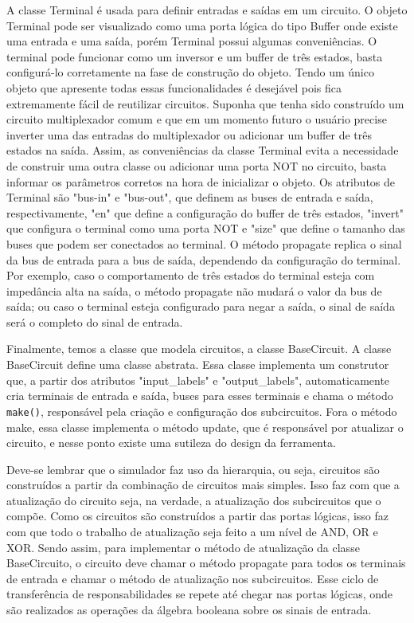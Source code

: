 A classe Terminal é usada para definir entradas e saídas em um circuito.
O objeto Terminal pode ser visualizado como uma porta lógica do tipo Buffer onde existe uma entrada e uma saída, porém Terminal possui algumas conveniências.
O terminal pode funcionar como um inversor e um buffer de três estados, basta configurá-lo corretamente na fase de construção do objeto.
Tendo um único objeto que apresente todas essas funcionalidades é desejável pois fica extremamente fácil de reutilizar circuitos.
Suponha que tenha sido construído um circuito multiplexador comum e que em um momento futuro o usuário precise inverter uma das entradas do multiplexador ou adicionar um buffer de três estados na saída.
Assim, as conveniências da classe Terminal evita a necessidade de construir uma outra classe ou adicionar uma porta NOT no circuito, basta informar os parâmetros corretos na hora de inicializar o objeto.
Os atributos de Terminal são "bus-in" e "bus-out", que definem as buses de entrada e saída, respectivamente, "en" que define a configuração do buffer de três estados, "invert" que configura o terminal como uma porta NOT e "size" que define o tamanho das buses que podem ser conectados ao terminal.
O método propagate replica o sinal da bus de entrada para a bus de saída, dependendo da configuração do terminal.
Por exemplo, caso o comportamento de três estados do terminal esteja com impedância alta na saída, o método propagate não mudará o valor da bus de saída;
ou caso o terminal esteja configurado para negar a saída, o sinal de saída será o completo do sinal de entrada.

Finalmente, temos a classe que modela circuitos, a classe BaseCircuit.
A classe BaseCircuit define uma classe abstrata.
Essa classe implementa um construtor que, a partir dos atributos "input\_labels" e "output\_labels", automaticamente cria terminais de entrada e saída, buses para esses terminais e chama o método \texttt{make()}, responsável pela criação e configuração dos subcircuitos.
Fora o método make, essa classe implementa o método update, que é responsável por atualizar o circuito, e nesse ponto existe uma sutileza do design da ferramenta.

Deve-se lembrar que o simulador faz uso da  hierarquia, ou seja, circuitos são construídos a partir da combinação de circuitos mais simples.
Isso faz com que a atualização do circuito seja, na verdade, a atualização dos subcircuitos que o compõe. 
Como os circuitos são construídos a partir das portas lógicas, isso faz com que todo o trabalho de atualização seja feito a um nível de AND, OR e XOR.
Sendo assim, para implementar o método de atualização da classe BaseCircuito, o circuito deve chamar o método propagate para todos os terminais de entrada e chamar o método de atualização nos subcircuitos.
Esse ciclo de transferência de responsabilidades se repete até chegar nas portas lógicas, onde são realizados as operações da álgebra booleana sobre os sinais de entrada.

